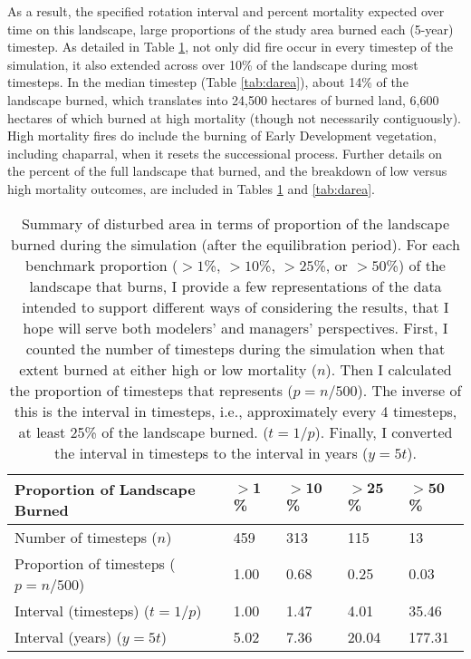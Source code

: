As a result, the specified rotation interval and percent mortality expected over time on this landscape, large proportions of the study area burned each (5-year) timestep. As detailed in Table \ref{tab:darea_atleast}, not only did fire occur in every timestep of the simulation, it also extended across over 10\% of the landscape during most timesteps. In the median timestep (Table \ref{tab:darea}), about 14\% of the landscape burned, which translates into 24,500 hectares of burned land, 6,600 hectares of which burned at high mortality (though not necessarily contiguously). High mortality fires do include the burning of Early Development vegetation, including chaparral, when it resets the successional process. Further details on the percent of the full landscape that burned, and the breakdown of low versus high mortality outcomes, are included in Tables \ref{tab:darea_atleast} and \ref{tab:darea}.

\begin{table}[!htbp]
\footnotesize
\centering
\caption{Summary of disturbed area in terms of proportion of the landscape burned during the simulation (after the equilibration period). For each benchmark proportion ($>1$\%, $>10$\%, $>25$\%, or $>50$\%) of the landscape that burns, I provide a few representations of the data intended to support different ways of considering the results, that I hope will serve both modelers' and managers' perspectives. First, I counted the number of timesteps during the simulation when that extent burned at either high or low mortality ($n$). Then I calculated the proportion of timesteps that represents ($p = n/500$). The inverse of this is the interval in timesteps, i.e., approximately every 4 timesteps, at least 25\% of the landscape burned. ($t = 1/p$). Finally, I converted the interval in timesteps to the interval in years ($y = 5t$).}
\label{tab:darea_atleast}
\begin{tabular}{@{}lllll@{}}
\toprule
 \textbf{Proportion of Landscape Burned} & \textbf{$\mathbf{>1}$\%}     & \textbf{$\mathbf{>10}$\%}    & \textbf{$\mathbf{>25}$\%}    & \textbf{$\mathbf{>50}$\%} \\ \midrule
Number of timesteps ($n$)        & 459              & 313              & 115              & 13            \\
Proportion of timesteps ($p = n/500$)    & 1.00             & 0.68             & 0.25             & 0.03          \\
Interval (timesteps) ($t = 1/p$)      & 1.00             & 1.47             & 4.01             & 35.46         \\
Interval (years)    ($y = 5t$)       & 5.02             & 7.36             & 20.04            & 177.31        \\ \bottomrule
\end{tabular}
\end{table}

